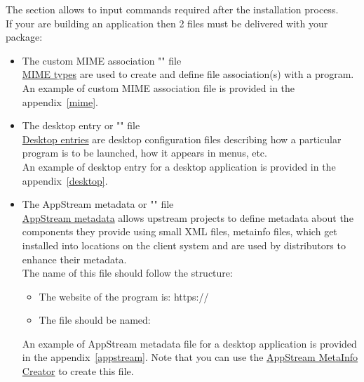 The  section allows to input commands required after the installation process. \\
If your are building an application then 2 files must be delivered with your package:
\begin{itemize}
\item The custom MIME association "" file \\[0.25cm]
\href{https://help.gnome.org/admin/system-admin-guide/stable/mime-types.html.en}{MIME types} are used to create and define file association(s) with a program. \\ 
An example of custom MIME association file is provided in the appendix~\ref{mime}.
\item The desktop entry or "" file \\[0.25cm]
\href{https://specifications.freedesktop.org/desktop-entry-spec/latest/}{Desktop entries} are desktop configuration files describing 
how a particular program is to be launched, how it appears in menus, etc. \\
An example of desktop entry for a desktop application is provided in the appendix~\ref{desktop}.
\item The AppStream metadata or "" file \\[0.25cm]
\href{https://www.freedesktop.org/software/appstream/docs/}{AppStream metadata} allows upstream projects to define metadata 
about the components they provide using small XML files, metainfo files, which get installed into locations on the client system 
and are used by distributors to enhance their metadata. \\ 
The name of this file should follow the structure:
\vspace{-0.125cm}
\begin{center}\end{center}
\vspace{-0.25cm}
\begin{itemize}
\item The website of the program is: \quad https://
\item The file should be named: \quad\qquad {}
\end{itemize}
An example of AppStream metadata file for a desktop application is provided in the appendix~\ref{appstream}. 
Note that you can use the \href{https://www.freedesktop.org/software/appstream/metainfocreator/\#/}{AppStream MetaInfo Creator} to create this file. 
\end{itemize}
